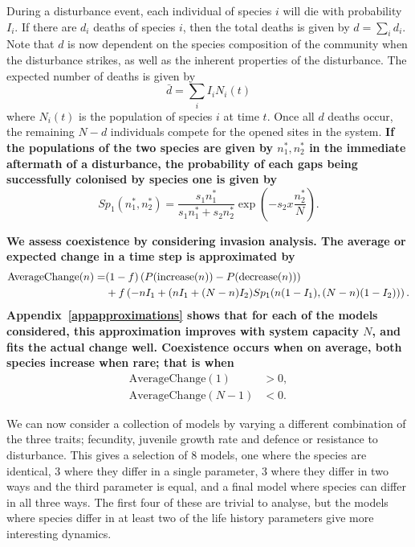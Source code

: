 \documentclass[preprint,10pt,reqno]{amsart}
\begin{document}
During a disturbance event, each individual of species $i$ will die with probability $I_i$. If there are $d_i$ deaths of species $i$, then the total deaths is given by $d=\sum_i d_i$. Note that $d$ is now dependent on the species composition of the community when the disturbance strikes, as well as the inherent properties of the disturbance. The expected number of deaths is given by
\begin{equation}
\label{avdeaths} \bar{d}=\sum_i I_i N_i(t)
\end{equation}
where $N_i(t)$ is the population of species $i$ at time $t$. Once all $d$ deaths occur, the remaining $N-d$ individuals compete for the opened sites in the system. \textbf{If the populations of the two species are given by $n_1^*,n_2^*$ in the immediate aftermath of a disturbance, the probability of each gaps being successfully colonised by species one is given by}
\begin{equation}
\label{sp1}
Sp_1(n_1^*,n_2^*)=\frac{s_1 n_1^*}{s_1n_1^*+s_2n_2^*}\exp \left(-s_2 x\frac{n_2^*}{N}\right).
\end{equation}

\textbf{We assess coexistence by considering invasion analysis. The average or expected change in a time step is approximated by
\begin{align}
\label{ac}
\text{AverageChange}(n)=&(1-f)\left(P(\text{increase}(n))-P(\text{decrease}(n))\right)  \\
&+f\left(-nI_1 +(nI_1+(N-n)I_2)Sp_1(n(1-I_1),(N-n)(1-I_2))\right).\notag
\end{align}
Appendix~\ref{appapproximations} shows that for each of the models considered, this approximation improves with system capacity $N$, and fits the actual change well. Coexistence occurs when on average, both species increase when rare; that is when}
\begin{align*}
\text{AverageChange}(1)&>0,\\
\text{AverageChange}(N-1)&<0. \end{align*}

We can now consider a collection of models by varying a different combination of the three traits; fecundity, juvenile growth rate and defence or resistance to disturbance. This gives a selection of 8 models, one where the species are identical, 3 where they differ in a single parameter, 3 where they differ in two ways and the third parameter is equal, and a final model where species can differ in all three ways. The first four of these are trivial to analyse, but the models where species differ in at least two of the life history parameters give more interesting dynamics.
\end{document}

